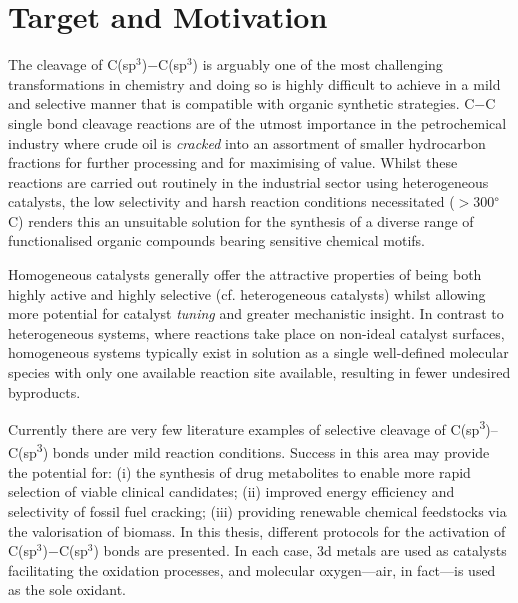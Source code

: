 
\chapter{Target and Motivation} %

\label{ch:target} %


\noindent The cleavage of C(sp$^3$)$-$C(sp$^3$) is arguably one of the most challenging transformations in chemistry and doing so is highly difficult to achieve in a mild and selective manner that is compatible with organic synthetic strategies. C$-$C single bond cleavage reactions are of the utmost importance in the petrochemical industry where crude oil is \textit{cracked} into an assortment of smaller hydrocarbon fractions for further processing and for maximising of value. Whilst these reactions are carried out routinely in the industrial sector using heterogeneous catalysts, the low selectivity and harsh reaction conditions necessitated ($>300$\textsuperscript{$\circ$}C) renders this an unsuitable solution for the synthesis of a diverse range of functionalised organic compounds bearing sensitive chemical motifs.

Homogeneous catalysts generally offer the attractive properties of being both highly active and highly selective (cf. heterogeneous catalysts) whilst allowing more potential for catalyst \textit{tuning} and greater mechanistic insight. In contrast to heterogeneous systems, where reactions take place on non-ideal catalyst surfaces, homogeneous systems typically exist in solution as a single well-defined molecular species with only one available reaction site available, resulting in fewer undesired byproducts.

Currently there are very few literature examples of selective cleavage of C(sp\textsuperscript{3})--C(sp\textsuperscript{3}) bonds under mild reaction conditions. Success in this area may provide the potential for: (i) the synthesis of drug metabolites to enable more rapid selection of viable clinical candidates; (ii) improved energy efficiency and selectivity of fossil fuel cracking; (iii) providing renewable chemical feedstocks via the valorisation of biomass. In this thesis, different protocols for the activation of C(sp$^3$)$-$C(sp$^3$) bonds are presented. In each case, $3$d metals are used as catalysts facilitating the oxidation processes, and molecular oxygen---air, in fact---is used as the sole oxidant.

